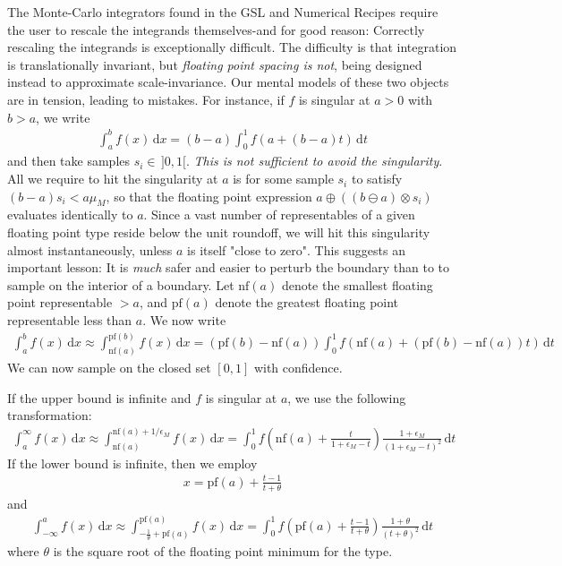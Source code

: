 \documentclass{ansarticle}
\begin{document}
The Monte-Carlo integrators found in the GSL and Numerical Recipes require the user to rescale the integrands themselves-and for good reason: Correctly rescaling the integrands is exceptionally difficult.
The difficulty is that integration is translationally invariant, but \emph{floating point spacing is not}, being designed instead to approximate scale-invariance.
Our mental models of these two objects are in tension, leading to mistakes.
For instance, if $f$ is singular at $a > 0$ with $b > a$, we write
\begin{align*}
\int_{a}^{b} f(x) \, \mathrm{d}x = (b-a) \int_{0}^{1} f(a + (b-a)t) \, \mathrm{d}t
\end{align*}
and then take samples $s_{i}\in\, ]0, 1[$.
\emph{This is not sufficient to avoid the singularity}.
All we require to hit the singularity at $a$ is for some sample $s_i$ to satisfy $(b-a)s_i < a\mu_{M}$, so that the floating point expression $a\oplus((b\ominus a)\otimes s_i)$ evaluates identically to $a$.
Since a vast number of representables of a given floating point type reside below the unit roundoff, we will hit this singularity almost instantaneously, unless $a$ is itself "close to zero".
This suggests an important lesson: It is \emph{much} safer and easier to perturb the boundary than to to sample on the interior of a boundary.
Let $\mathrm{nf}(a)$ denote the smallest floating point representable $> a$, and $\mathrm{pf}(a)$ denote the greatest floating point representable less than $a$.
We now write
\begin{align*}
\int_{a}^{b} f(x) \, \mathrm{d}x \approx \int_{\mathrm{nf}(a)}^{\mathrm{pf}(b)} f(x) \, \mathrm{d}x  = (\mathrm{pf}(b)- \mathrm{nf}(a)) \int_{0}^{1} f(\mathrm{nf}(a) + (\mathrm{pf}(b)-\mathrm{nf}(a))t) \, \mathrm{d}t
\end{align*}
We can now sample on the closed set $[0, 1]$ with confidence.

If the upper bound is infinite and $f$ is singular at $a$, we use the following transformation:
\begin{align*}
\int_{a}^{\infty} f(x) \, \mathrm{d}x \approx \int_{\mathrm{nf}(a)}^{\mathrm{nf}(a) + 1/\epsilon_{M}} f(x) \, \mathrm{d}x = \int_{0}^{1} f\left(\mathrm{nf}(a) + \frac{t}{1+\epsilon_{M} - t}\right) \frac{1+\epsilon_{M}}{(1+\epsilon_{M} -t)^2} \, \mathrm{d}t
\end{align*}
If the lower bound is infinite, then we employ
\begin{align*}
x = \mathrm{pf}(a) + \frac{t-1}{t+\theta}
\end{align*}
and
\begin{align*}
\int_{-\infty}^{a} f(x) \, \mathrm{d}x
\approx
\int_{-\frac{1}{\theta} + \mathrm{pf}(a)}^{ \mathrm{pf}(a)} f(x) \, \mathrm{d}x
=
\int_{0}^{1} f\left( \mathrm{pf}(a)+ \frac{t-1}{t+\theta}\right) \frac{1+\theta}{(t+\theta)^{2}} \, \mathrm{d}t
\end{align*}
where $\theta$ is the square root of the floating point minimum for the type.
\end{document}

